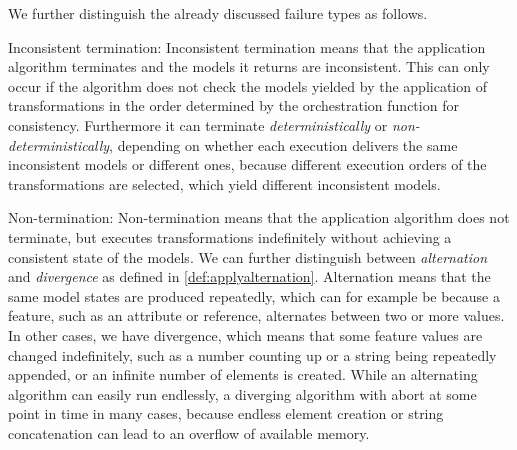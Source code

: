 We further distinguish the already discussed failure types as follows.
\begin{properdescription}
    \item[Inconsistent termination:] 
    Inconsistent termination means that the application algorithm terminates and the models it returns are inconsistent.
    This can only occur if the algorithm does not check the models yielded by the application of transformations in the order determined by the orchestration function for consistency.
    Furthermore it can terminate \emph{deterministically} or \emph{non-deterministically}, depending on whether each execution delivers the same inconsistent models or different ones, because different execution orders of the transformations are selected, which yield different inconsistent models.

    \item[Non-termination:] 
    Non-termination means that the application algorithm does not terminate, but executes transformations indefinitely without achieving a consistent state of the models.
    We can further distinguish between \emph{alternation} and \emph{divergence} as defined in \autoref{def:applyalternation}.
    Alternation means that the same model states are produced repeatedly, which can for example be because a feature, such as an attribute or reference, alternates between two or more values.
    In other cases, we have divergence, which means that some feature values are changed indefinitely, such as a number counting up or a string being repeatedly appended, or an infinite number of elements is created.
    While an alternating algorithm can easily run endlessly, a diverging algorithm with abort at some point in time in many cases, because endless element creation or string concatenation can lead to an overflow of available memory.
    

\end{properdescription}
